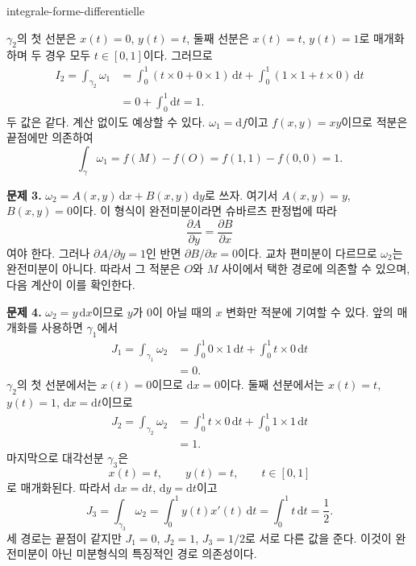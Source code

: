 \begin{exo}{integrale-forme-differentielle}
\begin{solution}
$\gamma_2$의 첫 선분은 $x(t)=0$, $y(t)=t$, 둘째 선분은
$x(t)=t$, $y(t)=1$로 매개화하며 두 경우 모두 $t\in[0,1]$이다. 그러므로
\[
\begin{aligned}
I_2
= \int_{\gamma_2}\omega_1
&= \int_0^1\left(t\times 0+0\times 1\right)\,\mathrm{d}t
 + \int_0^1\left(1\times 1+t\times 0\right)\,\mathrm{d}t \\
&= 0+\int_0^1\mathrm{d}t = 1.
\end{aligned}
\]
두 값은 같다. 계산 없이도 예상할 수 있다. $\omega_1=\mathrm{d}f$이고
$f(x,y)=xy$이므로 적분은 끝점에만 의존하여
\[
\int_\gamma\omega_1=f(M)-f(O)=f(1,1)-f(0,0)=1.
\]

\textbf{문제 3.} $\omega_2=A(x,y)\,\mathrm{d}x+B(x,y)\,\mathrm{d}y$로 쓰자.
여기서 $A(x,y)=y$, $B(x,y)=0$이다. 이 형식이 완전미분이라면 슈바르츠 판정법에 따라
\[
\frac{\partial A}{\partial y}=\frac{\partial B}{\partial x}
\]
여야 한다. 그러나 $\partial A/\partial y=1$인 반면 $\partial B/\partial x=0$이다.
교차 편미분이 다르므로 $\omega_2$는 완전미분이 아니다. 따라서 그 적분은 $O$와 $M$
사이에서 택한 경로에 의존할 수 있으며, 다음 계산이 이를 확인한다.

\textbf{문제 4.} $\omega_2=y\,\mathrm{d}x$이므로 $y$가 0이 아닐 때의
$x$ 변화만 적분에 기여할 수 있다. 앞의 매개화를 사용하면 $\gamma_1$에서
\[
\begin{aligned}
J_1
=\int_{\gamma_1}\omega_2
&=\int_0^1 0\times 1\,\mathrm{d}t
  +\int_0^1 t\times 0\,\mathrm{d}t \\
&=0.
\end{aligned}
\]
$\gamma_2$의 첫 선분에서는 $x(t)=0$이므로 $\mathrm{d}x=0$이다.
둘째 선분에서는 $x(t)=t$, $y(t)=1$, $\mathrm{d}x=\mathrm{d}t$이므로
\[
\begin{aligned}
J_2
=\int_{\gamma_2}\omega_2
&=\int_0^1 t\times 0\,\mathrm{d}t
  +\int_0^1 1\times 1\,\mathrm{d}t \\
&=1.
\end{aligned}
\]
마지막으로 대각선분 $\gamma_3$은
\[
x(t)=t,\qquad y(t)=t,\qquad t\in[0,1]
\]
로 매개화된다. 따라서 $\mathrm{d}x=\mathrm{d}t$, $\mathrm{d}y=\mathrm{d}t$이고
\[
J_3
=\int_{\gamma_3}\omega_2
=\int_0^1 y(t)x'(t)\,\mathrm{d}t
=\int_0^1 t\,\mathrm{d}t
=\frac12.
\]
세 경로는 끝점이 같지만 $J_1=0$, $J_2=1$, $J_3=1/2$로 서로 다른 값을 준다.
이것이 완전미분이 아닌 미분형식의 특징적인 경로 의존성이다.
\end{solution}
\end{exo}

